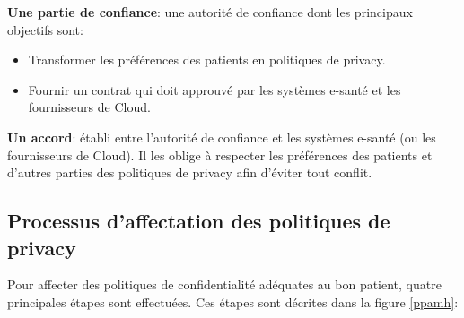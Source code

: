 \vspace{8pt}
\paragraphmark

\textbf{Une partie de confiance}: une autorité de confiance dont les principaux objectifs sont:

\vspace{6pt}
\paragraphmark

\begin{itemize}
	\item Transformer les préférences des patients en politiques de privacy.
	\item Fournir un contrat qui doit approuvé par les systèmes e-santé et les fournisseurs de Cloud.
\end{itemize}

\vspace{8pt}
\paragraphmark

\textbf{Un accord}: établi entre l'autorité de confiance et les systèmes e-santé (ou les fournisseurs de Cloud). Il les oblige à respecter les préférences des patients et d'autres parties des politiques de privacy afin d'éviter tout conflit.

\subsection{Processus d'affectation des politiques de privacy}

Pour affecter des politiques de confidentialité adéquates au bon patient, quatre principales étapes sont effectuées. Ces étapes sont décrites dans la figure \ref{ppamh}:

\vspace{8pt}
\paragraphmark

